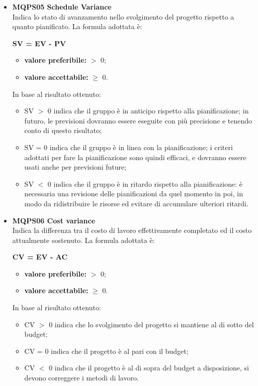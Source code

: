 \begin{itemize}
	\item[] \textbf{MQPS05 Schedule Variance} \\
	Indica lo stato di avanzamento nello svolgimento del progetto rispetto a quanto pianificato.
	La formula adottata è:
	\begin{center}
		\textbf{SV = EV - PV}
	\end{center}
	\begin{itemize}
		\item \textbf{valore preferibile:} $>$ 0;
		\item \textbf{valore accettabile:} $\geq$ 0.
	\end{itemize}
	In base al risultato ottenuto:
	\begin{itemize}
		\item SV $>$ 0  indica che il gruppo è in anticipo rispetto alla pianificazione; in futuro,
		le previsioni dovranno essere eseguite con più precisione e tenendo conto di questo
		risultato;
		\item SV = 0  indica che il gruppo è in linea con la pianificazione; i criteri adottati per
		fare la pianificazione sono quindi efficaci, e dovranno essere usati anche per previsioni
		future;
		\item SV $<$ 0 indica che il gruppo è in ritardo rispetto alla pianificazione: è necessaria
		una revisione delle pianificazioni da quel momento in poi, in modo da ridistribuire le
		risorse ed evitare di accumulare ulteriori ritardi.
	\end{itemize}

	\item[] \textbf{MQPS06 Cost variance} \\
	Indica la differenza tra il costo di lavoro effettivamente completato ed il costo attualmente sostenuto.
	La formula adottata è:
	\begin{center}
		\textbf{CV = EV - AC}
	\end{center}
	\begin{itemize}
		\item \textbf{valore preferibile:} $>$ 0;
		\item \textbf{valore accettabile:} $\geq$ 0.
	\end{itemize}
	In base al risultato ottenuto:
	\begin{itemize}
		\item CV $>$ 0 indica che lo svolgimento del progetto si mantiene al di sotto del budget;
		\item CV = 0 indica che il progetto è al pari con il budget;
		\item CV $<$ 0 indica che il progetto è al di sopra del budget a disposizione, si devono correggere i metodi di lavoro.
	\end{itemize}

\end{itemize}

